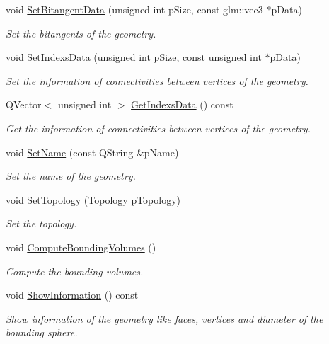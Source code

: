 \begin{DoxyCompactItemize}
void \hyperlink{class_geometry_acbd0f21bbac3d33618dad636cce56503}{Set\+Bitangent\+Data} (unsigned int p\+Size, const glm\+::vec3 $\ast$p\+Data)
\begin{DoxyCompactList}\small\item\em Set the bitangents of the geometry. \end{DoxyCompactList}\item 
void \hyperlink{class_geometry_a1f303c21b32fca8f04d8adbcf23ecbbc}{Set\+Indexs\+Data} (unsigned int p\+Size, const unsigned int $\ast$p\+Data)
\begin{DoxyCompactList}\small\item\em Set the information of connectivities between vertices of the geometry. \end{DoxyCompactList}\item 
Q\+Vector$<$ unsigned int $>$ \hyperlink{class_geometry_a31440da8dc7f95faf6d02b04dc22b71b}{Get\+Indexs\+Data} () const 
\begin{DoxyCompactList}\small\item\em Get the information of connectivities between vertices of the geometry. \end{DoxyCompactList}\item 
void \hyperlink{class_geometry_a07481afac86ea0c4ae8193159533acde}{Set\+Name} (const Q\+String \&p\+Name)
\begin{DoxyCompactList}\small\item\em Set the name of the geometry. \end{DoxyCompactList}\item 
void \hyperlink{class_geometry_a6c406fec6e370cf1c9e3b3ea7c9f027b}{Set\+Topology} (\hyperlink{class_geometry_af0136a3b268286ee5921cc6af5239293}{Topology} p\+Topology)
\begin{DoxyCompactList}\small\item\em Set the topology. \end{DoxyCompactList}\item 
void \hyperlink{class_geometry_ac85092de7676b3f40d7a0bf4c75df8ba}{Compute\+Bounding\+Volumes} ()
\begin{DoxyCompactList}\small\item\em Compute the bounding volumes. \end{DoxyCompactList}\item 
void \hyperlink{class_geometry_ac5ca4e8358fd614fd15c1950a2b9d7e0}{Show\+Information} () const 
\begin{DoxyCompactList}\small\item\em Show information of the geometry like faces, vertices and diameter of the bounding sphere. \end{DoxyCompactList}\item 

\end{DoxyCompactItemize}
